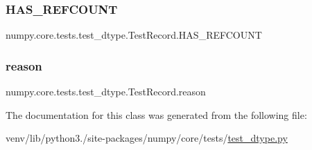 \subsubsection{\texorpdfstring{H\+A\+S\+\_\+\+R\+E\+F\+C\+O\+U\+NT}{HAS\_REFCOUNT}}
{\footnotesize\ttfamily numpy.\+core.\+tests.\+test\+\_\+dtype.\+Test\+Record.\+H\+A\+S\+\_\+\+R\+E\+F\+C\+O\+U\+NT\hspace{0.3cm}{\ttfamily [static]}}

\mbox{\label{classnumpy_1_1core_1_1tests_1_1test__dtype_1_1TestRecord_a68ee99ce3cb6280bf4e4a0a81f7262f0}} 
\subsubsection{\texorpdfstring{reason}{reason}}
{\footnotesize\ttfamily numpy.\+core.\+tests.\+test\+\_\+dtype.\+Test\+Record.\+reason\hspace{0.3cm}{\ttfamily [static]}}



The documentation for this class was generated from the following file\+:\begin{DoxyCompactItemize}
\item 
venv/lib/python3./site-\/packages/numpy/core/tests/\hyperlink{test__dtype_8py}{test\+\_\+dtype.\+py}\end{DoxyCompactItemize}
